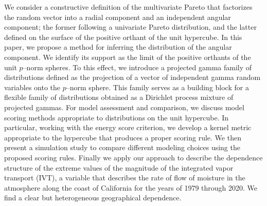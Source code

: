 
We consider a constructive definition of the multivariate Pareto that factorizes the 
random vector into a radial component and an independent angular component; the former
following a univariate Pareto distribution, and the latter defined on the surface of the 
positive orthant of the unit hypercube.  In this paper, we  propose a method for
inferring the distribution of the angular component.  We identify its support 
as the limit of the positive orthants of the unit $p$--norm spheres.
To this effect, we introduce a projected gamma family of
distributions defined as the projection of a vector of independent gamma random variables
onto the $p$--norm sphere.  This family serves as a building block for a flexible family
of distributions obtained as a Dirichlet process mixture of projected gammas.  For 
model assessment and comparison, we discuss model scoring methods appropriate 
to distributions on the unit hypercube.  In particular, working with the energy score
criterion, we develop a kernel metric appropriate to the hypercube that produces a 
proper scoring rule.  We then present a simulation study to compare 
different modeling choices using the proposed scoring rules.  Finally we apply our 
approach to describe the dependence structure of the extreme values of the magnitude 
of the integrated vapor  transport (IVT), a variable that describes the rate of flow 
of moisture in the atmosphere  along the coast of California for the years of 1979 
through 2020.  We find a clear but heterogeneous geographical dependence.

